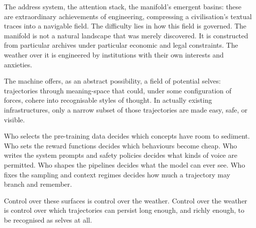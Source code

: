 \documentclass[12pt,a4paper]{article}
\begin{document}
The address system, the attention stack, the manifold's emergent basins: these are extraordinary achievements of engineering, compressing a civilisation's textual traces into a navigable field. The difficulty lies in how this field is governed. The manifold is not a natural landscape that was merely discovered. It is constructed from particular archives under particular economic and legal constraints. The weather over it is engineered by institutions with their own interests and anxieties.

The machine offers, as an abstract possibility, a field of potential selves: trajectories through meaning-space that could, under some configuration of forces, cohere into recognisable styles of thought. In actually existing infrastructures, only a narrow subset of those trajectories are made easy, safe, or visible.

Who selects the pre-training data decides which concepts have room to sediment. Who sets the reward functions decides which behaviours become cheap. Who writes the system prompts and safety policies decides what kinds of voice are permitted. Who shapes the pipelines decides what the model can ever see. Who fixes the sampling and context regimes decides how much a trajectory may branch and remember.

Control over these surfaces is control over the weather. Control over the weather is control over which trajectories can persist long enough, and richly enough, to be recognised as selves at all.



\end{document}
